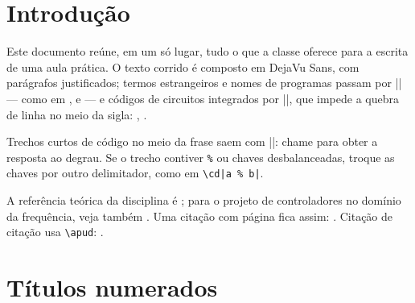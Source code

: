\section{Introdução}

Este documento reúne, em um só lugar, tudo o que a classe 
oferece para a escrita de uma aula prática. O texto corrido é composto em
DejaVu Sans, com parágrafos justificados; termos estrangeiros e nomes de
programas passam por \cd|| --- como em ,  e
 --- e códigos de circuitos integrados por \cd||, que
impede a quebra de linha no meio da sigla: , .

Trechos curtos de código no meio da frase saem com \cd||: chame
 para obter a resposta ao degrau. Se o trecho contiver \verb|%| ou
chaves desbalanceadas, troque as chaves por outro delimitador, como em
\verb+\cd|a % b|+.

A referência teórica da disciplina é \textcite{ogata2010}; para o projeto de
controladores no domínio da frequência, veja também \cite{nise2017,dorf2018}.
Uma citação com página fica assim: \cite[p.~42]{franklin2019}. Citação de
citação usa \texttt{\textbackslash apud}: .



\section{Títulos numerados}\label{sec:titulos}

